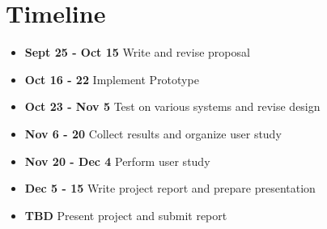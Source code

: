 \section{Timeline}
\label{sec:timeline}

\begin{itemize}
    \item \textbf{Sept 25 - Oct 15} Write and revise proposal
    \item \textbf{Oct 16 - 22} Implement Prototype
    \item \textbf{Oct 23 - Nov 5} Test on various systems and revise design
    \item \textbf{Nov 6 - 20} Collect results and organize user study
    \item \textbf{Nov 20 - Dec 4} Perform user study
    \item \textbf{Dec 5 - 15} Write project report and prepare presentation
    \item \textbf{TBD} Present project and submit report
\end{itemize}
